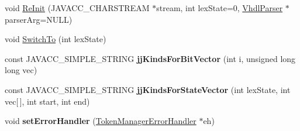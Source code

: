 \begin{DoxyCompactItemize}
\item 
void \mbox{\hyperlink{classvhdl_1_1parser_1_1_vhdl_parser_token_manager_a8afc0bad1c4eb86e10be77df8206adfb}{Re\+Init}} (J\+A\+V\+A\+C\+C\+\_\+\+C\+H\+A\+R\+S\+T\+R\+E\+AM $\ast$stream, int lex\+State=0, \mbox{\hyperlink{classvhdl_1_1parser_1_1_vhdl_parser}{Vhdl\+Parser}} $\ast$parser\+Arg=N\+U\+LL)
\item 
void \mbox{\hyperlink{classvhdl_1_1parser_1_1_vhdl_parser_token_manager_a73a2f8822cfb4c49cc36c767f4db42d4}{Switch\+To}} (int lex\+State)
\item 
\mbox{\label{classvhdl_1_1parser_1_1_vhdl_parser_token_manager_a9335b256d17c011c40bee4abf6cb4ed9}} 
const J\+A\+V\+A\+C\+C\+\_\+\+S\+I\+M\+P\+L\+E\+\_\+\+S\+T\+R\+I\+NG {\bfseries jj\+Kinds\+For\+Bit\+Vector} (int i, unsigned long long vec)
\item 
\mbox{\label{classvhdl_1_1parser_1_1_vhdl_parser_token_manager_a702fc3bb80b5834d8a16d1685b23e0cb}} 
const J\+A\+V\+A\+C\+C\+\_\+\+S\+I\+M\+P\+L\+E\+\_\+\+S\+T\+R\+I\+NG {\bfseries jj\+Kinds\+For\+State\+Vector} (int lex\+State, int vec\mbox{[}$\,$\mbox{]}, int start, int end)
\item 
\mbox{\label{classvhdl_1_1parser_1_1_vhdl_parser_token_manager_af10e66a2453415cb8f5778d60d4f6dd2}} 
void {\bfseries set\+Error\+Handler} (\mbox{\hyperlink{classvhdl_1_1parser_1_1_token_manager_error_handler}{Token\+Manager\+Error\+Handler}} $\ast$eh)
\end{DoxyCompactItemize}
